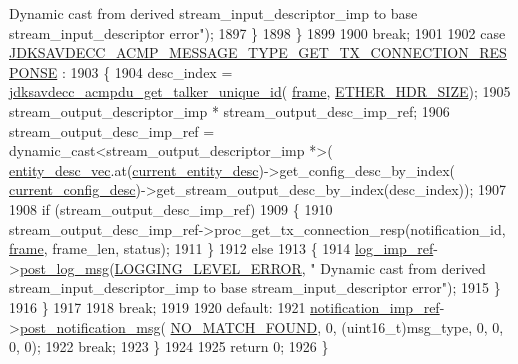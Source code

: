 \begin{DoxyCode}
{      Dynamic cast from derived stream\_input\_descriptor\_imp to base stream\_input\_descriptor error"});
1897         \}
1898     \}
1899 
1900     \textcolor{keywordflow}{break};
1901 
1902     \textcolor{keywordflow}{case} \hyperlink{group__acmp__message__type_gac8d2fee5822f733200680da98472958f}{JDKSAVDECC\_ACMP\_MESSAGE\_TYPE\_GET\_TX\_CONNECTION\_RESPONSE}
      :
1903     \{
1904         desc\_index = \hyperlink{group__acmpdu_ga1f24a73adfcd4cf526ad8c10a6f2e42f}{jdksavdecc\_acmpdu\_get\_talker\_unique\_id}(
      \hyperlink{gst__avb__playbin_8c_ac8e710e0b5e994c0545d75d69868c6f0}{frame}, \hyperlink{namespaceavdecc__lib_a6c827b1a0d973e18119c5e3da518e65ca9512ad9b34302ba7048d88197e0a2dc0}{ETHER\_HDR\_SIZE});
1905         stream\_output\_descriptor\_imp * stream\_output\_desc\_imp\_ref;
1906         stream\_output\_desc\_imp\_ref = \textcolor{keyword}{dynamic\_cast<}stream\_output\_descriptor\_imp *\textcolor{keyword}{>}(
      \hyperlink{classavdecc__lib_1_1end__station__imp_a72edab41bc56e3c1757944a7df188a3d}{entity\_desc\_vec}.at(\hyperlink{classavdecc__lib_1_1end__station__imp_afd78c89df26ba7641e1adb764c0e827d}{current\_entity\_desc})->get\_config\_desc\_by\_index(
      \hyperlink{classavdecc__lib_1_1end__station__imp_a60b1af40d35e8a86b0082c54ab6cb6a8}{current\_config\_desc})->get\_stream\_output\_desc\_by\_index(desc\_index));
1907 
1908         \textcolor{keywordflow}{if} (stream\_output\_desc\_imp\_ref)
1909         \{
1910             stream\_output\_desc\_imp\_ref->proc\_get\_tx\_connection\_resp(notification\_id, 
      \hyperlink{gst__avb__playbin_8c_ac8e710e0b5e994c0545d75d69868c6f0}{frame}, frame\_len, status);
1911         \}
1912         \textcolor{keywordflow}{else}
1913         \{
1914             \hyperlink{namespaceavdecc__lib_acbe3e2a96ae6524943ca532c87a28529}{log\_imp\_ref}->\hyperlink{classavdecc__lib_1_1log_a68139a6297697e4ccebf36ccfd02e44a}{post\_log\_msg}(\hyperlink{namespaceavdecc__lib_a501055c431e6872ef46f252ad13f85cdaf2c4481208273451a6f5c7bb9770ec8a}{LOGGING\_LEVEL\_ERROR}, \textcolor{stringliteral}{"
      Dynamic cast from derived stream\_input\_descriptor\_imp to base stream\_input\_descriptor error"});
1915         \}
1916     \}
1917 
1918     \textcolor{keywordflow}{break};
1919 
1920     \textcolor{keywordflow}{default}:
1921         \hyperlink{namespaceavdecc__lib_aca078f7550e970a17b3f732c26bc3d83}{notification\_imp\_ref}->\hyperlink{classavdecc__lib_1_1notification_a2775ca78354ea78d68bf107c084b3822}{post\_notification\_msg}(
      \hyperlink{namespaceavdecc__lib_ad2a3e740ca3019cf9fd0f9514afb6419ad0504a48cf7cd6bd199c9ceffade00ca}{NO\_MATCH\_FOUND}, 0, (uint16\_t)msg\_type, 0, 0, 0, 0);
1922         \textcolor{keywordflow}{break};
1923     \}
1924 
1925     \textcolor{keywordflow}{return} 0;
1926 \}
\end{DoxyCode}


